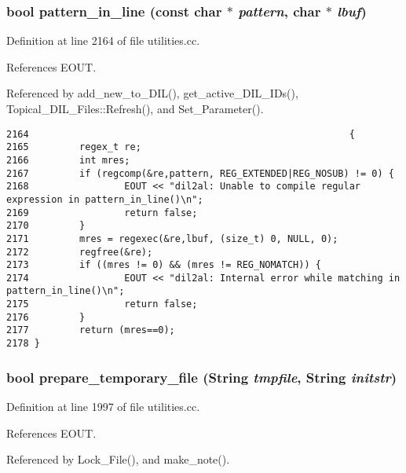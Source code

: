 \subsubsection{\setlength{\rightskip}{0pt plus 5cm}bool pattern\_\-in\_\-line (const char $\ast$ {\em pattern}, char $\ast$ {\em lbuf})}\label{utilities_8cc_a44}




Definition at line 2164 of file utilities.cc.

References EOUT.

Referenced by add\_\-new\_\-to\_\-DIL(), get\_\-active\_\-DIL\_\-IDs(), Topical\_\-DIL\_\-Files::Refresh(), and Set\_\-Parameter().



\footnotesize\begin{verbatim}2164                                                         {
2165         regex_t re;
2166         int mres;
2167         if (regcomp(&re,pattern, REG_EXTENDED|REG_NOSUB) != 0) {
2168                 EOUT << "dil2al: Unable to compile regular expression in pattern_in_line()\n";
2169                 return false;
2170         }
2171         mres = regexec(&re,lbuf, (size_t) 0, NULL, 0);
2172         regfree(&re);
2173         if ((mres != 0) && (mres != REG_NOMATCH)) {
2174                 EOUT << "dil2al: Internal error while matching in pattern_in_line()\n";
2175                 return false;
2176         }
2177         return (mres==0);
2178 }
\end{verbatim}\normalsize 
{}
\subsubsection{\setlength{\rightskip}{0pt plus 5cm}bool prepare\_\-temporary\_\-file ({\bf String} {\em tmpfile}, {\bf String} {\em initstr})}\label{utilities_8cc_a35}




Definition at line 1997 of file utilities.cc.

References EOUT.

Referenced by Lock\_\-File(), and make\_\-note().



